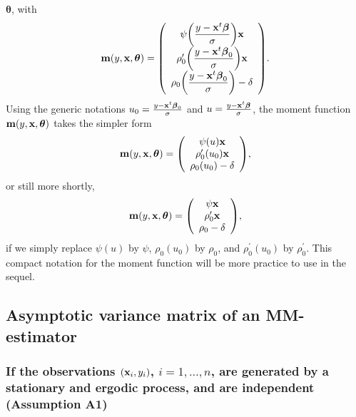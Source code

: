 $\boldsymbol{\theta}$, with
\[
\mathbf{m}\left(  y,\stvec{x},\boldsymbol{\theta}\right)  =\left(
\begin{array}
[c]{c}%
\psi\left(  \dfrac{y-\stvec{x}^{t}\boldsymbol\beta}{\sigma}\right)
\stvec{x}\\
\rho_{0}^{\prime}\left(  \dfrac{y-\stvec{x}^{t}\boldsymbol\beta_{0}}%
{\sigma}\right)  \stvec{x}\\
\rho_{0}\left(  \dfrac{y-\stvec{x}^{t}\boldsymbol\beta_{0}}{\sigma}\right)
-\delta
\end{array}
\right)  .
\]
Using the generic notations $u_{0}=\frac{y-\mathbf x^{t}\boldsymbol{\beta
}_{0}}{\sigma}$ and $u=\frac{y-\mathbf x^{t}\boldsymbol\beta}{\sigma}$, the
moment function $\mathbf{m}\left(  y,\stvec{x},\boldsymbol{\theta}\right)  $
takes the simpler form
\[
\mathbf{m}\left(  y,\stvec{x},\boldsymbol{\theta}\right)  =\left(
\begin{array}
[c]{c}%
\psi\left(  u\right)  \stvec{x}\\
\rho_{0}^{\prime}\left(  u_{0}\right)  \stvec{x}\\
\rho_{0}\left(  u_{0}\right)  -\delta
\end{array}
\right)  ,
\]
or still more shortly,
\begin{equation}
\mathbf{m}\left(  y,\stvec{x},\boldsymbol{\theta}\right)  =\left(
\begin{array}
[c]{c}%
\psi\stvec{x}\\
\rho_{0}^{\prime}\stvec{x}\\
\rho_{0}-\delta
\end{array}
\right)  , \label{Eq:GMM_moment_function_MM}%
\end{equation}
if we simply replace $\psi\left(  u\right)  $ by $\psi$, $\rho_{0}\left(
u_{0}\right)  $ by $\rho_{0}$, and $\rho_{0}^{\prime}\left(  u_{0}\right)  $
by $\rho_{0}^{\prime}$. This compact notation for the moment function will be
more practice to use in the sequel.

\subsection{Asymptotic variance matrix of an MM-estimator}

\subsubsection{If the observations $\left(  \stvec{x}_{i},y_{i}\right)  $,
$i = 1, \dots, n$, are generated by a stationary and ergodic process, and are
independent (Assumption A1)}

